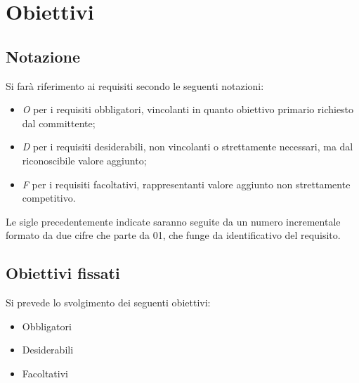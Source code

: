 \section*{Obiettivi}
\subsection*{Notazione}
Si farà riferimento ai requisiti secondo le seguenti notazioni:
\begin{itemize}
	\item \textit{O} per i requisiti obbligatori, vincolanti in quanto obiettivo primario richiesto dal committente;
	\item \textit{D} per i requisiti desiderabili, non vincolanti o strettamente necessari, ma dal riconoscibile valore aggiunto;
	\item \textit{F} per i requisiti facoltativi, rappresentanti valore aggiunto non strettamente competitivo.
\end{itemize}

Le sigle precedentemente indicate saranno seguite da un numero incrementale formato da due cifre che parte da 01, che funge da identificativo del requisito.

\subsection*{Obiettivi fissati}
Si prevede lo svolgimento dei seguenti obiettivi:
\begin{itemize}
	\item Obbligatori
	\begin{itemize}
		\obiettiviObbligatori
	\end{itemize}
	
	\item Desiderabili 
	\begin{itemize}
		\obiettiviDesiderabili
	\end{itemize}
	
	\item Facoltativi
	\begin{itemize}
		\obiettiviFacoltativi
	\end{itemize} 
\end{itemize}

\newpage